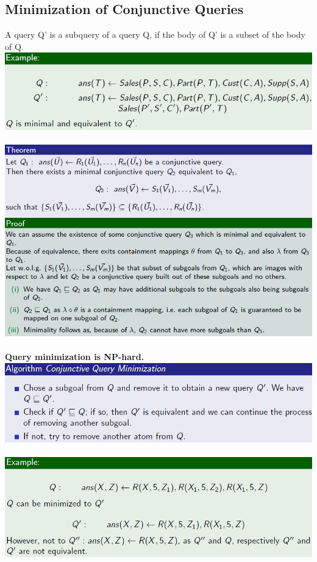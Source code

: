 \documentclass{article}
\begin{document}
\subsection{Minimization of Conjunctive Queries}
A query Q' is a subquery of a query Q, if the body of Q' is a subset of the body of Q.\\
\includegraphics[scale=0.6]{69.png} \\\\
\includegraphics[scale=0.6]{70.png} \\\\
\textbf{Query minimization is NP-hard.}\\
\includegraphics[scale=0.6]{71.png} \\\\
\includegraphics[scale=0.6]{72.png} \\\\
\end{document}

